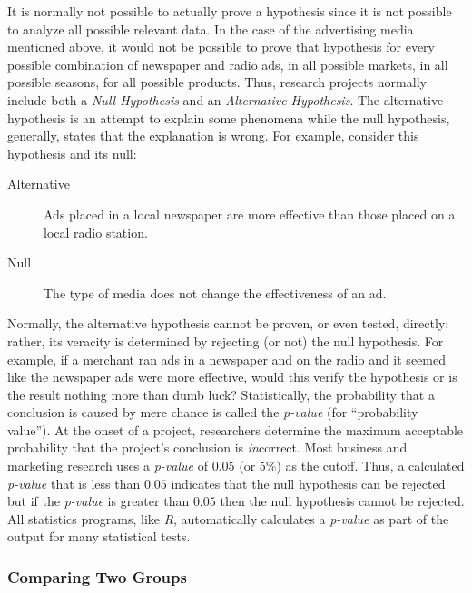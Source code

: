 It is normally not possible to actually prove a hypothesis since it is not possible to analyze all possible relevant data. In the case of the advertising media mentioned above, it would not be possible to prove that hypothesis for every possible combination of newspaper and radio ads, in all possible markets, in all possible seasons, for all possible products. Thus, research projects normally include both a \textit{Null Hypothesis} and an \textit{Alternative Hypothesis}. The alternative hypothesis is an attempt to explain some phenomena while the null hypothesis, generally, states that the explanation is wrong. For example, consider this hypothesis and its null:

\begin{description}
	\item[Alternative] Ads placed in a local newspaper are more effective than those placed on a local radio station.
	\item[Null] The type of media does not change the effectiveness of an ad.
\end{description}

Normally, the alternative hypothesis cannot be proven, or even tested, directly; rather, its veracity is determined by rejecting (or not) the null hypothesis. For example, if a merchant ran ads in a newspaper and on the radio and it seemed like the newspaper ads were more effective, would this verify the hypothesis or is the result nothing more than dumb luck? Statistically, the probability that a conclusion is caused by mere chance is called the \textit{p-value} (for ``probability value''). At the onset of a project, researchers determine the maximum acceptable probability that the project's conclusion is \textit{in}correct. Most business and marketing research uses a \textit{p-value} of $ 0.05 $ (or $ 5\% $) as the cutoff. Thus, a calculated \textit{p-value} that is less than $ 0.05 $ indicates that the null hypothesis can be rejected but if the \textit{p-value} is greater than $ 0.05 $ then the null hypothesis cannot be rejected. All statistics programs, like \textit{R}, automatically calculates a \textit{p-value} as part of the output for many statistical tests.

\subsubsection{Comparing Two Groups}

